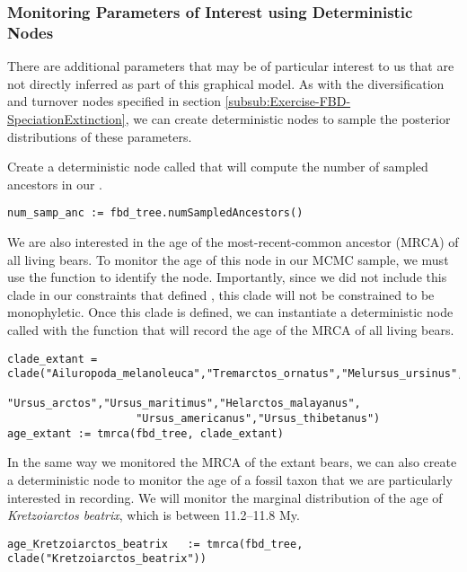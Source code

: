 \subsubsection{Monitoring Parameters of Interest using Deterministic Nodes}\label{subsub:Exercise-FBD-DetNodes}

There are additional parameters that may be of particular interest to us that are not directly inferred as part of this graphical model. 
As with the diversification and turnover nodes specified in section \ref{subsub:Exercise-FBD-SpeciationExtinction}, we can create deterministic nodes to sample the posterior distributions of these parameters. 
%

Create a deterministic node called  that will compute the number of sampled ancestors in our .
{\tt \begin{snugshade*}
\begin{lstlisting}
num_samp_anc := fbd_tree.numSampledAncestors()
\end{lstlisting}
\end{snugshade*}}


We are also interested in the age of the most-recent-common ancestor (MRCA) of all living bears. 
To monitor the age of this node in our MCMC sample, we must use the  function to identify the node. Importantly, since we did not include this clade in our constraints that defined , this clade will not be constrained to be monophyletic. 
Once this clade is defined, we can instantiate a deterministic node called  with the  function that will record the age of the MRCA of all living bears.
{\tt \begin{snugshade*}
\begin{lstlisting}
clade_extant = clade("Ailuropoda_melanoleuca","Tremarctos_ornatus","Melursus_ursinus",
                    "Ursus_arctos","Ursus_maritimus","Helarctos_malayanus",
                    "Ursus_americanus","Ursus_thibetanus")
age_extant := tmrca(fbd_tree, clade_extant)
\end{lstlisting}
\end{snugshade*}}

In the same way we monitored the MRCA of the extant bears, we can also create a deterministic node to monitor the age of a fossil taxon that we are particularly interested in recording. 
We will monitor the marginal distribution of the age of \textit{Kretzoiarctos beatrix}, which is between 11.2--11.8 My.
{\tt \begin{snugshade*}
\begin{lstlisting}
age_Kretzoiarctos_beatrix   := tmrca(fbd_tree, clade("Kretzoiarctos_beatrix"))
\end{lstlisting}
\end{snugshade*}}

